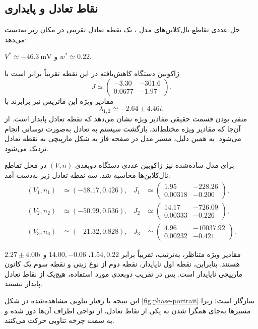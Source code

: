 \subsection{نقاط تعادل و پایداری}

حل عددی تقاطع نال‌کلاین‌های مدل ، یک نقطه تعادل تقریبی در مکان زیر به‌دست می‌دهد:
\begin{center}
	$V^*\simeq -46.3\ \mathrm{mV}$ و $w^*\simeq 0.22$.
\end{center}

ژاکوبین دستگاه کاهش‌یافته در این نقطه تقریباً برابر است با
\[
J \simeq
\begin{pmatrix}
	-3.30 & -301.6\\
	0.0677 & -1.97
\end{pmatrix}.
\]
مقادیر ویژه این ماتریس نیز برابرند با
\[
\lambda_{1,2}\simeq -2.64 \pm 4.46i.
\]
منفی بودن قسمت حقیقی مقادیر ویژه نشان می‌دهد که نقطه تعادل پایدار است. از آن‌جا که مقادیر ویژه مختلط‌اند، بازگشت سیستم به تعادل به‌صورت نوسانی انجام می‌شود. به همین دلیل، مسیر مدل  در صفحه فاز به شکل مارپیچی به نقطه تعادل نزدیک می‌شود. 

برای مدل ساده‌شده  نیز ژاکوبین عددی دستگاه دوبعدی $(V,n)$ در محل تقاطع نال‌کلاین‌ها محاسبه شد. سه نقطه تعادل زیر به‌دست آمد:
\begin{align*}
	(V_1,n_1)&\simeq(-58.17,0.426), &
	J_1&\simeq\begin{pmatrix}1.95&-228.26\\0.00318&-0.200\end{pmatrix},\\
	(V_2,n_2)&\simeq(-50.99,0.536), &
	J_2&\simeq\begin{pmatrix}14.17&-726.09\\0.00333&-0.226\end{pmatrix},\\
	(V_3,n_3)&\simeq(-21.32,0.828), &
	J_3&\simeq\begin{pmatrix}4.96&-10037.92\\0.00232&-0.421\end{pmatrix}.
\end{align*}

مقادیر ویژه متناظر، به‌ترتیب، تقریباً برابر $1.54,0.22$، $14.00,-0.06$ و $2.27\pm4.00i$ هستند. بنابراین، نقطه اول ناپایدار، نقطه دوم از نوع زینی و نقطه سوم یک کانون مارپیچی ناپایدار است. پس در تقریب دوبعدی مورد استفاده، هیچ‌یک از نقاط تعادل پایدار نیستند.

این نتیجه با رفتار تناوبی مشاهده‌شده در شکل \ref{fig:phase-portrait} سازگار است؛ زیرا مسیرها به‌جای همگرا شدن به یکی از نقاط تعادل، از نواحی اطراف آن‌ها دور شده و به سمت چرخه تناوبی حرکت می‌کنند. 

